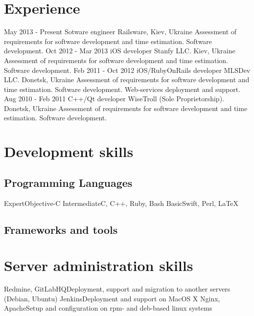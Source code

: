 \documentclass[11pt,a4paper]{moderncv}
\begin{document}
\section{Experience}
\cventry
  {May 2013 - Present}
  {Sotware engineer}
  {Railsware, Kiev, Ukraine}
  {}{}
  {Assessment of requirements for software development and time estimation. 
  \newline{}Software development.}
\cventry
  {Oct 2012 - Mar 2013}
  {iOS developer}
  {Stanfy LLC. Kiev, Ukraine}
  {}{}
  {Assessment of requirements for software development and time estimation. 
  \newline{}Software development.}
\cventry
  {Feb 2011 - Oct 2012}
  {iOS/RubyOnRails developer}
  {MLSDev LLC. Donetsk, Ukraine}
  {}{}
  {Assessment of requirements for software development and time estimation. 
  \newline{}Software development.
  \newline{}Web-services deployment and support.}
\cventry
  {Aug 2010 - Feb 2011}
  {C++/Qt developer}
  {WiseTroll (Sole Proprietorship). Donetsk, Ukraine}
  {}{}
  {Assessment of requirements for software development and time estimation. 
  \newline{}Software development.}


\section{Development skills}
\subsection{Programming Languages}
\cvline
  {Expert}{Objective-C}
\cvline
  {Intermediate}{C, C++, Ruby, Bash}
\cvline
  {Basic}{Swift, Perl, LaTeX}
\subsection{Frameworks and tools}

\section{Server administration skills}
\cvline
  {Redmine, GitLabHQ}{Deployment, support and migration to another servers (Debian, Ubuntu)}
\cvline
  {Jenkins}{Deployment and support on MacOS X}
\cvline
  {Nginx, Apache}{Setup and configuration on rpm- and deb-based linux systems}
\end{document}
